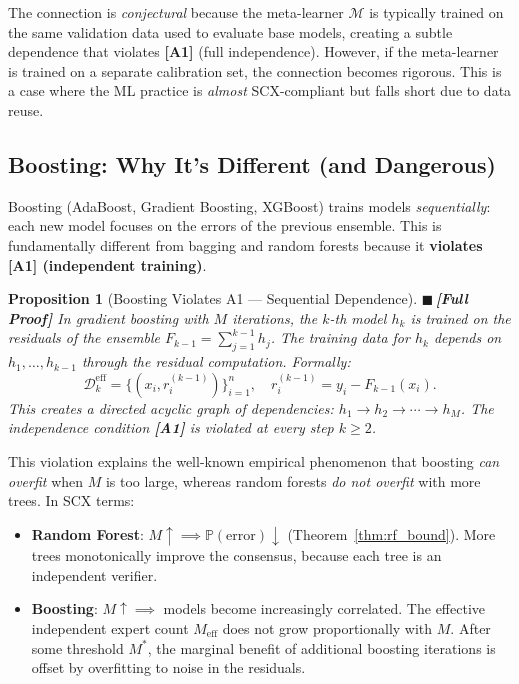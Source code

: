 \documentclass[12pt,a4paper]{article}
\newtheorem{proposition}[theorem]{Proposition}
\theoremstyle{definition}
\newcommand{\rigorFull}{{\color{rigorcolor}$\blacksquare$\,\textbf{[Full Proof]}}}
\newcommand{\SCX}{\textsc{SCX}}
\newcommand{\Pbb}{\mathbb{P}}
\newcommand{\cD}{\mathcal{D}}
\newcommand{\cM}{\mathcal{M}}
\newcommand{\asmTag}[1]{\textsf{\textbf{[A#1]}}}
\begin{document}
The connection is \emph{conjectural} because the meta-learner $\cM$ is typically trained on the same validation data used to evaluate base models, creating a subtle dependence that violates \asmTag{1} (full independence). However, if the meta-learner is trained on a separate calibration set, the connection becomes rigorous. This is a case where the ML practice is \emph{almost} \SCX-compliant but falls short due to data reuse.

\subsection{Boosting: Why It's Different (and Dangerous)}

Boosting (AdaBoost, Gradient Boosting, XGBoost) trains models \emph{sequentially}: each new model focuses on the errors of the previous ensemble. This is fundamentally different from bagging and random forests because it \textbf{violates \asmTag{1} (independent training)}.

\begin{proposition}[Boosting Violates A1 — Sequential Dependence]\label{prop:boosting_violation}
\rigorFull
In gradient boosting with $M$ iterations, the $k$-th model $h_k$ is trained on the residuals of the ensemble $F_{k-1} = \sum_{j=1}^{k-1} h_j$. The training data for $h_k$ depends on $h_1, \ldots, h_{k-1}$ through the residual computation. Formally:
\begin{equation}\label{eq:boosting_dep}
    \cD_k^{\text{eff}} = \{(x_i, r_i^{(k-1)})\}_{i=1}^n, \quad r_i^{(k-1)} = y_i - F_{k-1}(x_i).
\end{equation}
This creates a directed acyclic graph of dependencies: $h_1 \to h_2 \to \cdots \to h_M$. The independence condition \asmTag{1} is violated at every step $k \ge 2$.
\end{proposition}

This violation explains the well-known empirical phenomenon that boosting \emph{can overfit} when $M$ is too large, whereas random forests \emph{do not overfit} with more trees. In \SCX{} terms:

\begin{itemize}
    \item \textbf{Random Forest}: $M \uparrow \implies \Pbb(\text{error}) \downarrow$ (Theorem~\ref{thm:rf_bound}). More trees monotonically improve the consensus, because each tree is an independent verifier.
    \item \textbf{Boosting}: $M \uparrow \implies$ models become increasingly correlated. The effective independent expert count $M_{\text{eff}}$ does not grow proportionally with $M$. After some threshold $M^*$, the marginal benefit of additional boosting iterations is offset by overfitting to noise in the residuals.
\end{itemize}
\end{document}
